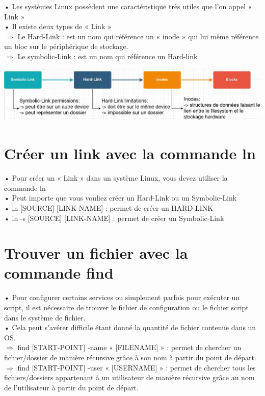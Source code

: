 \documentclass[a4paper, 11pt, french, oneside]{book}
\begin{document}
• Les systèmes Linux possèdent une caractéristique très utiles que l’on appel « Link »\\
• Il existe deux types de « Link »\\

$\Rightarrow$ Le Hard-Link : est un nom qui référence un « inode » qui lui même référence un bloc sur le périphérique de stockage.\\

$\Rightarrow$ Le symbolic-Link : est un nom qui référence un Hard-link

\begin{flushleft}
\includegraphics[scale=0.6]{link.jpg}
\end{flushleft}

\section{\Large Créer un link avec la commande ln}

• Pour créer un « Link » dans un système Linux, vous devez utiliser la commande ln\\
• Peut importe que vous vouliez créer un Hard-Link ou un Symbolic-Link\\
• ln [SOURCE] [LINK-NAME] : permet de créer un HARD-LINK\\
• ln -s [SOURCE] [LINK-NAME] : permet de créer un Symbolic-Link\\
 
 \section{\Large Trouver un fichier avec la commande find}
 
 • Pour configurer certains services ou simplement parfois pour exécuter un script, il est nécessaire de trouver le fichier de configuration ou le fichier script dans le système de fichier.\\
• Cela peut s’avérer difficile étant donné la quantité de fichier contenue dans un OS.\\
$\Rightarrow$ find [START-POINT] -name « [FILENAME] » : permet de chercher un fichier/dossier de manière récursive grâce à son nom à partir du point de départ.\\
$\Rightarrow$ find [START-POINT] -user « [USERNAME] » : permet de chercher tous les fichiers/dossiers appartenant à un utilisateur de manière
récursive grâce au nom de l’utilisateur à partir du point de départ.
 
\end{document}
